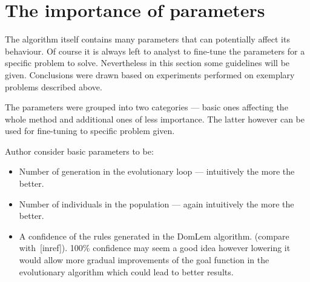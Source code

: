 \clearpage{}
\section{The importance of parameters}

The algorithm itself contains many parameters that can potentially affect its
behaviour. Of course it is always left to analyst to fine-tune the parameters
for a specific problem to solve. Nevertheless in this section some guidelines
will be given. Conclusions were drawn based on experiments performed on
exemplary problems described above.

The parameters were grouped into two categories --- basic ones affecting the
whole method and additional ones of less importance. The latter however can be
used for fine-tuning to specific problem given.

Author consider basic parameters to be:
\begin{itemize}
\item Number of generation in the evolutionary loop --- intuitively the more
  the better.
\item Number of individuals in the population --- again intuitively the more
  the better.
\item A confidence of the rules generated in the DomLem algorithm. (compare
  with~[inref]). 100\% confidence may seem a good idea however lowering it
  would allow more gradual improvements of the goal function in the
  evolutionary algorithm which could lead to better results.
\end{itemize}


